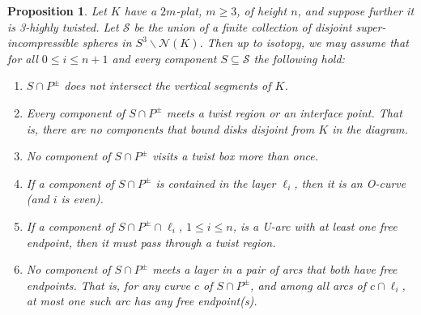 \documentclass[12pt,reqno]{amsart}
\theoremstyle{plain}
\newtheorem{proposition}[theorem]{Proposition}
\theoremstyle{definition}
\newcommand{\NN}{\mathcal{N}}
\newcommand{\calS}{\mathcal{S}}
\newcommand{\ssm}{\smallsetminus}
\begin{document}
\begin{proposition}\label{removing unwanted intersections}
Let $K$ have a $2m$-plat, $m\geq 3$, of height $n$, 
and suppose further it is 3-highly twisted. Let $\calS$ be the union of a finite 
collection of disjoint super-incompressible spheres in $S^3\ssm \NN(K)$. Then 
up to isotopy, we may assume that for all $0\le i\le n+1$ and every component 
$S\subseteq  \calS$ the following hold:
\begin{enumerate}[label = ($\diamondsuit$\arabic*)]
\item\label{no vertical intersection}  $S\cap P^\pm$ does not intersect the 
vertical segments of $K$.

\item \label{menasco no scc} Every component of $S\cap P^\pm$ meets a twist region or 
an interface point. That is, there are no components that bound disks disjoint from 
$K$ in the diagram. 

\item\label{menasco assumptions} No component of $S\cap P^\pm$ visits a twist 
box more than once.

\item\label{no scc in layers} If a component of $S\cap P^\pm$ is contained in the 
layer $\ell_i$, then it is an O-curve (and $i$ is even).

\item\label{no trivial U-arcs} 
If a component of $S\cap P^\pm\cap \ell_i$, $1\le i\le n$, is a U-arc with at 
least one free endpoint, then it must pass through a 
twist region.

\item\label{no double intersection outside} 
No component of $S\cap P^\pm$ meets a layer in a pair of arcs that both have 
free endpoints. That is, for any curve $c$ of $S\cap P^\pm$, and among all 
arcs of $c\cap \ell_i$, at most one such arc has any free endpoint(s).
\end{enumerate}
\end{proposition}
\end{document}
